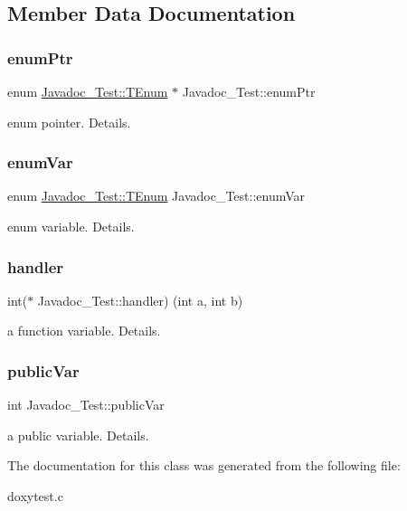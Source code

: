 \subsection{Member Data Documentation}
\mbox{\label{class_javadoc___test_afa0fcc085875735f7f11b4c98dd984a8}} 
\subsubsection{\texorpdfstring{enum\+Ptr}{enumPtr}}
{\footnotesize\ttfamily enum \hyperlink{class_javadoc___test_ae37fd1cbf1af522674cbd33873b786a6}{Javadoc\+\_\+\+Test\+::\+T\+Enum}
       $\ast$ Javadoc\+\_\+\+Test\+::enum\+Ptr}

enum pointer. Details. \mbox{\label{class_javadoc___test_a689558649150237b53a5c8ed89c996c2}} 
\subsubsection{\texorpdfstring{enum\+Var}{enumVar}}
{\footnotesize\ttfamily enum \hyperlink{class_javadoc___test_ae37fd1cbf1af522674cbd33873b786a6}{Javadoc\+\_\+\+Test\+::\+T\+Enum}
        Javadoc\+\_\+\+Test\+::enum\+Var}

enum variable. Details. \mbox{\label{class_javadoc___test_ace81a523a4eef44501a841a6d338832b}} 
\subsubsection{\texorpdfstring{handler}{handler}}
{\footnotesize\ttfamily int($\ast$ Javadoc\+\_\+\+Test\+::handler) (int a, int b)}

a function variable. Details. \mbox{\label{class_javadoc___test_a44a516fbc3a4865e2dcae34649c9df6a}} 
\subsubsection{\texorpdfstring{public\+Var}{publicVar}}
{\footnotesize\ttfamily int Javadoc\+\_\+\+Test\+::public\+Var}

a public variable. Details. 

The documentation for this class was generated from the following file\+:\begin{DoxyCompactItemize}
\item 
doxytest.\+c\end{DoxyCompactItemize}
